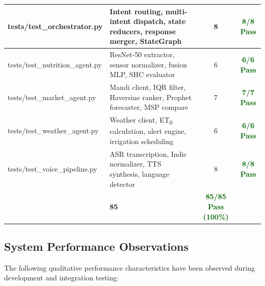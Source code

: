 \documentclass[12pt,a4paper]{article}
\newlength{\defbaselineskip}
\newcommand{\setlinespacing}[1]{\setlength{\baselineskip}{#1 \defbaselineskip}}
\begin{document}
\begin{table}[!htbp]
\begin{tabularx}{\textwidth}{|>{\raggedright\arraybackslash}p{5.1cm}|>{\raggedright\arraybackslash}X|c|c|}
\hline
tests/test\_orchestrator.py & Intent routing, multi-intent dispatch, state reducers, response merger, StateGraph & 8 & \textcolor{darkGreen}{\textbf{8/8 Pass}} \\
\hline
tests/test\_nutrition\_agent.py & ResNet-50 extractor, sensor normalizer, fusion MLP, SHC evaluator & 6 & \textcolor{darkGreen}{\textbf{6/6 Pass}} \\
\hline
tests/test\_market\_agent.py & Mandi client, IQR filter, Haversine ranker, Prophet forecaster, MSP compare & 7 & \textcolor{darkGreen}{\textbf{7/7 Pass}} \\
\hline
tests/test\_weather\_agent.py & Weather client, ET\textsubscript{0} calculation, alert engine, irrigation scheduling & 6 & \textcolor{darkGreen}{\textbf{6/6 Pass}} \\
\hline
tests/test\_voice\_pipeline.py & ASR transcription, Indic normalizer, TTS synthesis, language detector & 8 & \textcolor{darkGreen}{\textbf{8/8 Pass}} \\
\hline
\multicolumn{2}{|l|}{\textbf{Total}} & \textbf{85} & \textcolor{darkGreen}{\textbf{85/85 Pass (100\%)}} \\
\hline
\end{tabularx}
\end{table}

\setlinespacing{1.14}
\subsection{System Performance Observations}

The following qualitative performance characteristics have been observed during development and integration testing:
\end{document}
